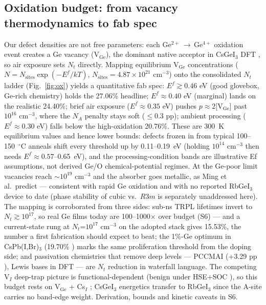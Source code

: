 \documentclass[aip,jap,amsmath,amssymb,preprint]{revtex4-2}
\begin{document}
\subsection{Oxidation budget: from vacancy thermodynamics to fab spec}
Our defect densities are not free parameters: each Ge$^{2+}$\,$\rightarrow$\,Ge$^{4+}$ oxidation event creates a Ge vacancy (V$_{\mathrm{Ge}}$), the dominant native acceptor in CsGeI$_{3}$ DFT \cite{rMing}, so air exposure sets $N_{t}$ directly. Mapping equilibrium V$_{\mathrm{Ge}}$ concentrations ($N=N_{\mathrm{sites}}\exp(-E^f/kT)$, $N_{\mathrm{sites}}=4.87\times10^{21}$ cm$^{-3}$) onto the consolidated $N_{t}$ ladder (Fig.~\ref{fig:ox}) yields a quantitative fab spec: $E^f\gtrsim0.46$ eV (good glovebox, Ge-rich chemistry) holds the 27.06\% headline; $E^f\approx0.40$ eV (marginal) lands on the realistic 24.40\%; brief air exposure ($E^f\approx0.35$ eV) pushes $p\approx2$[V$_{\mathrm{Ge}}$] past $10^{16}$ cm$^{-3}$, where the $N_{A}$ penalty stays soft ($\le$0.3 pp); ambient processing ($E^f\approx0.30$ eV) falls below the high-oxidation 20.76\%. These are 300~K equilibrium values and hence lower bounds: defects frozen in from typical 100--150~$^{\circ}$C anneals shift every threshold up by 0.11--0.19~eV (holding $10^{14}$ cm$^{-3}$ then needs $E^f\approx0.57$--0.65~eV), and the processing-condition bands are illustrative Ef assumptions, not derived Ge/O chemical-potential regimes. At the Ge-poor limit vacancies reach $\sim$$10^{19}$ cm$^{-3}$ and the absorber goes metallic, as Ming et al.\ predict \cite{rMing} --- consistent with rapid Ge oxidation \cite{rThirumal} and with no reported RbGeI$_{3}$ device to date (phase stability of cubic vs.\ $R3m$ is separately unaddressed here). The mapping is corroborated from three sides: sub-ns TRPL lifetimes invert to $N_{t}\gtrsim10^{17}$, so real Ge films today are 100--1000$\times$ over budget \cite{rGeRev} (S6) --- and a current-state rung at $N_{t}$=$10^{17}$ cm$^{-3}$ on the adopted stack gives 15.53\%, the number a first fabrication should expect to beat; the 1\%-Ge optimum in CsPb(I,Br)$_{3}$ (19.70\% \cite{rGeDope}) marks the same proliferation threshold from the doping side; and passivation chemistries that remove deep levels --- PCCMAI (+3.29 pp \cite{rPCCMAI}), Lewis bases in DFT \cite{rKino} --- are $N_{t}$ reduction in waterfall language. The competing V$_{I}$ deep-trap picture is functional-dependent (benign under HSE+SOC \cite{rZhangPRX}), so this budget rests on V$_{\mathrm{Ge}}$ + Cs$_{I}$ \cite{rZhang24}; CsGeI$_{3}$ energetics transfer to RbGeI$_{3}$ since the A-site carries no band-edge weight. Derivation, bounds and kinetic caveats in S6.
\end{document}
